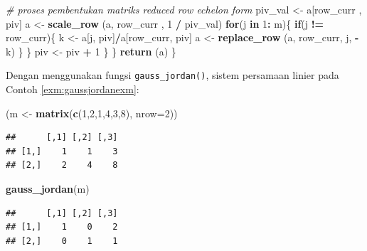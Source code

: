 \documentclass[
]{book}
\newenvironment{Shaded}{\begin{snugshade}}{\end{snugshade}}
\newcommand{\AttributeTok}[1]{\textcolor[rgb]{0.13,0.29,0.53}{#1}}
\newcommand{\CommentTok}[1]{\textcolor[rgb]{0.56,0.35,0.01}{\textit{#1}}}
\newcommand{\ControlFlowTok}[1]{\textcolor[rgb]{0.13,0.29,0.53}{\textbf{#1}}}
\newcommand{\DecValTok}[1]{\textcolor[rgb]{0.00,0.00,0.81}{#1}}
\newcommand{\FunctionTok}[1]{\textcolor[rgb]{0.13,0.29,0.53}{\textbf{#1}}}
\newcommand{\NormalTok}[1]{#1}
\newcommand{\OtherTok}[1]{\textcolor[rgb]{0.56,0.35,0.01}{#1}}
\newcommand{\SpecialCharTok}[1]{\textcolor[rgb]{0.81,0.36,0.00}{\textbf{#1}}}
\theoremstyle{definition}
\theoremstyle{definition}
\theoremstyle{definition}
\theoremstyle{definition}
\theoremstyle{remark}
\begin{document}
\begin{Shaded}
\begin{Highlighting}[]
\CommentTok{\# proses pembentukan matriks reduced row echelon form}
\NormalTok{            piv\_val }\OtherTok{\textless{}{-}}\NormalTok{ a[row\_curr , piv]}
\NormalTok{            a }\OtherTok{\textless{}{-}} \FunctionTok{scale\_row}\NormalTok{ (a, row\_curr , }\DecValTok{1} \SpecialCharTok{/}\NormalTok{ piv\_val)}
            \ControlFlowTok{for}\NormalTok{(j }\ControlFlowTok{in} \DecValTok{1}\SpecialCharTok{:}\NormalTok{ m)\{}
                \ControlFlowTok{if}\NormalTok{(j }\SpecialCharTok{!=}\NormalTok{ row\_curr)\{}
\NormalTok{                    k }\OtherTok{\textless{}{-}}\NormalTok{ a[j, piv]}\SpecialCharTok{/}\NormalTok{a[row\_curr, piv]}
\NormalTok{                    a }\OtherTok{\textless{}{-}} \FunctionTok{replace\_row}\NormalTok{ (a, row\_curr, j, }\SpecialCharTok{{-}}\NormalTok{k)}
\NormalTok{                \}}
\NormalTok{            \}}
\NormalTok{            piv }\OtherTok{\textless{}{-}}\NormalTok{ piv }\SpecialCharTok{+} \DecValTok{1}
\NormalTok{        \}}
\NormalTok{    \}}
    \FunctionTok{return}\NormalTok{ (a)}
\NormalTok{\}}
\end{Highlighting}
\end{Shaded}

Dengan menggunakan fungsi \texttt{gauss\_jordan()}, sistem persamaan linier pada Contoh \ref{exm:gaussjordanexm}:

\begin{Shaded}
\begin{Highlighting}[]
\NormalTok{(m }\OtherTok{\textless{}{-}} \FunctionTok{matrix}\NormalTok{(}\FunctionTok{c}\NormalTok{(}\DecValTok{1}\NormalTok{,}\DecValTok{2}\NormalTok{,}\DecValTok{1}\NormalTok{,}\DecValTok{4}\NormalTok{,}\DecValTok{3}\NormalTok{,}\DecValTok{8}\NormalTok{), }\AttributeTok{nrow=}\DecValTok{2}\NormalTok{))}
\end{Highlighting}
\end{Shaded}

\begin{verbatim}
##      [,1] [,2] [,3]
## [1,]    1    1    3
## [2,]    2    4    8
\end{verbatim}

\begin{Shaded}
\begin{Highlighting}[]
\FunctionTok{gauss\_jordan}\NormalTok{(m)}
\end{Highlighting}
\end{Shaded}

\begin{verbatim}
##      [,1] [,2] [,3]
## [1,]    1    0    2
## [2,]    0    1    1
\end{verbatim}
\end{document}

